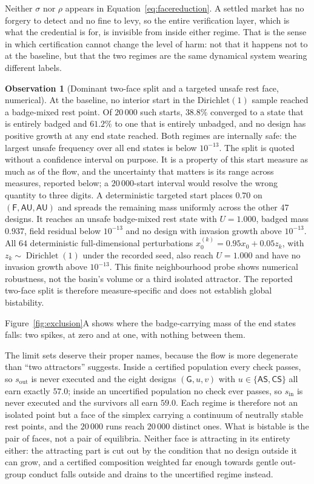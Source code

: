 \documentclass[11pt,a4paper]{article}
\theoremstyle{definition}
\newtheorem{observation}[theorem]{Observation}
\newcommand{\AS}{\textsf{AS}}
\newcommand{\CS}{\textsf{CS}}
\newcommand{\AU}{\textsf{AU}}
\begin{document}
Neither $\sigma$ nor $\rho$ appears in Equation~\eqref{eq:facereduction}. A
settled market has no forgery to detect and no fine to levy, so the entire
verification layer, which is what the credential is for, is invisible from
inside either regime. That is the sense in which certification cannot change
the level of harm: not that it happens not to at the baseline, but that the two
regimes are the same dynamical system wearing different labels.

\begin{observation}[Dominant two-face split and a targeted unsafe rest face, numerical]
\label{prop:bistable}
At the baseline, no interior start in the $\mathrm{Dirichlet}(1)$ sample
reached a badge-mixed rest point. Of $20\,000$ such starts, $38.8\%$ converged
to a state that is entirely badged and $61.2\%$ to one that is entirely
unbadged, and no design has positive growth at any end state reached. Both
regimes are internally safe: the largest unsafe frequency over all end states
is below $10^{-13}$. The split is quoted without a confidence interval on
purpose. It is a property of this start measure as much as of the flow, and the
uncertainty that matters is its range across measures, reported below; a
$20\,000$-start interval would resolve the wrong quantity to three digits.
A deterministic targeted start places $0.70$ on $(\mathsf{F},\AU,\AU)$ and
spreads the remaining mass uniformly across the other 47 designs. It reaches
an unsafe badge-mixed rest state with $U=1.000$, badged mass $0.937$, field
residual below $10^{-13}$ and no design with invasion growth above $10^{-13}$.
All $64$ deterministic full-dimensional perturbations
$x_0^{(k)}=0.95x_0+0.05z_k$, with $z_k\sim\operatorname{Dirichlet}(1)$ under
the recorded seed, also reach $U=1.000$ and have no invasion growth above
$10^{-13}$. This finite neighbourhood probe shows numerical robustness, not
the basin's volume or a third isolated attractor. The reported two-face split
is therefore measure-specific and does not establish global bistability.
\end{observation}

Figure~\ref{fig:exclusion}A shows where the badge-carrying mass of the end
states falls: two spikes, at zero and at one, with nothing between them.

The limit sets deserve their proper names, because the flow is more degenerate
than ``two attractors'' suggests. Inside a certified population every check
passes, so $s_{\mathrm{out}}$ is never executed and the eight designs
$(\mathsf{G}, u, v)$ with $u \in \{\AS, \CS\}$ all earn exactly $57.0$; inside
an uncertified population no check ever passes, so $s_{\mathrm{in}}$ is never
executed and the survivors all earn $59.0$. Each regime is therefore not an
isolated point but a face of the simplex carrying a continuum of neutrally
stable rest points, and the $20\,000$ runs reach $20\,000$ distinct ones. What
is bistable is the pair of faces, not a pair of equilibria. Neither face is
attracting in its entirety either: the attracting part is cut out by the
condition that no design outside it can grow, and a certified composition
weighted far enough towards gentle out-group conduct falls outside and drains
to the uncertified regime instead.
\end{document}
